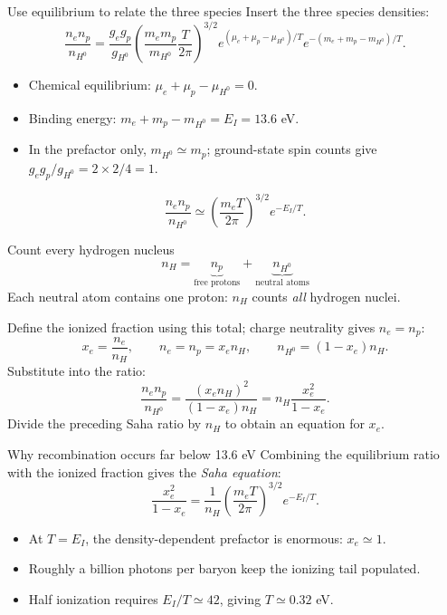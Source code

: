 \begin{frame}{Use equilibrium to relate the three species}
Insert the three species densities:
\[
\frac{n_en_p}{n_{H^0}}=
\frac{g_eg_p}{g_{H^0}}
\left(\frac{m_em_p}{m_{H^0}}\frac{T}{2\pi}\right)^{3/2}
e^{(\mu_e+\mu_p-\mu_{H^0})/T}
e^{-(m_e+m_p-m_{H^0})/T}.
\]
\begin{itemize}
\item Chemical equilibrium: $\mu_e+\mu_p-\mu_{H^0}=0$.
\item Binding energy: $m_e+m_p-m_{H^0}=E_I=13.6$ eV.
\item In the prefactor only, $m_{H^0}\simeq m_p$; ground-state spin counts give $g_eg_p/g_{H^0}=2\times2/4=1$.
\end{itemize}
\[
\boxed{\frac{n_en_p}{n_{H^0}}\simeq
\left(\frac{m_eT}{2\pi}\right)^{3/2}e^{-E_I/T}.}
\]
\end{frame}

\begin{frame}{Count every hydrogen nucleus}
\[
\boxed{n_H=\underbrace{n_p}_{\text{free protons}}+
\underbrace{n_{H^0}}_{\text{neutral atoms}}}
\]
Each neutral atom contains one proton: $n_H$ counts \emph{all} hydrogen nuclei.
\par Define the ionized fraction using this total; charge neutrality gives $n_e=n_p$:
\[
x_e=\frac{n_e}{n_H},\qquad n_e=n_p=x_en_H,\qquad
n_{H^0}=(1-x_e)n_H.
\]
Substitute into the ratio:
\[
\frac{n_en_p}{n_{H^0}}=
\frac{(x_en_H)^2}{(1-x_e)n_H}=n_H\frac{x_e^2}{1-x_e}.
\]
Divide the preceding Saha ratio by $n_H$ to obtain an equation for $x_e$.
\end{frame}

\begin{frame}{Why recombination occurs far below 13.6 eV}
Combining the equilibrium ratio with the ionized fraction gives the \emph{Saha equation}:
\[
\boxed{\frac{x_e^2}{1-x_e}=\frac1{n_H}
\left(\frac{m_eT}{2\pi}\right)^{3/2}e^{-E_I/T}.}
\]
\begin{itemize}
\item At $T=E_I$, the density-dependent prefactor is enormous: $x_e\simeq1$.
\item Roughly a billion photons per baryon keep the ionizing tail populated.
\item Half ionization requires $E_I/T\simeq42$, giving $T\simeq0.32$ eV.
\end{itemize}
\end{frame}

